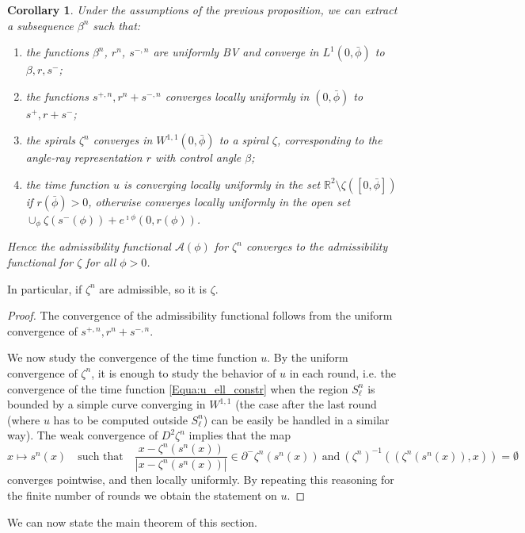 \documentclass[reqno]{amsart}
\newcounter{assu}
\theoremstyle{definition} \newtheorem{definition}{Definition}[section]
\theoremstyle{definition} \newtheorem{remark}[definition]{Remark}
\theoremstyle{plain} \newtheorem{lemma}[definition]{Lemma}
\theoremstyle{plain} \newtheorem{proposition}[definition]{Proposition}
\theoremstyle{plain} \newtheorem{theorem}[definition]{Theorem}
\theoremstyle{plain} \newtheorem{corollary}[definition]{Corollary}
\theoremstyle{definition} \newtheorem{example}[definition]{Example}
\theoremstyle{plain} \newtheorem{claim}[clai]{Claim}
\theoremstyle{definition} \newtheorem{assumption}[definition]{Assumption}
\theoremstyle{definition} \newtheorem{observation}[definition]{Observation}
\newcommand{\R}{\mathbb{R}}
\newcommand{\1}{\mathbbm 1}
\renewcommand{\i}{\imath}
\numberwithin{equation}{section} %
\theoremstyle{plain} \newtheorem*{theorem*}{Theorem}
\theoremstyle{plain} \newtheorem{mthm}[maintheorem]{Main Theorem}
\theoremstyle{plain} \newtheorem*{mthm*}{Main Theorem}
\theoremstyle{plain} \newtheorem*{conjecture*}{Conjecture}
\theoremstyle{plain} \newtheorem{conjecture}[definition]{Conjecture}
\theoremstyle{plain} \newtheorem*{problem*}{Problem}
\begin{document}
\begin{corollary}
\label{Cor:convergs}
Under the assumptions of the previous proposition, we can extract a subsequence $\beta^n$ such that:
\begin{enumerate}
\item the functions $\beta^n$, $r^n$, $s^{-,n}$ are uniformly BV and converge in $L^1(0,{\bar \phi})$ to $\beta,r,s^-$;
\item the functions $s^{+,n},r^n+s^{-,n}$ converges locally uniformly in $(0,{\bar \phi})$ to $s^+,r + s^-$;
\item the spirals $\zeta^n$ converges in $W^{1,1}(0,{\bar \phi})$ to a spiral $\zeta$, corresponding to the angle-ray representation $r$ with control angle $\beta$;
\item the time function $u$ is converging locally uniformly in the set $\R^2 \setminus \zeta([0,{\bar \phi}])$ if $r({\bar \phi}) > 0$, otherwise converges locally uniformly in the open set $\cup_\phi \zeta(s^-(\phi)) + e^{\i \phi} (0,r(\phi))$.
\end{enumerate}
Hence the admissibility functional $\mathcal A(\phi)$ for $\zeta^n$ converges to the admissibility functional for $\zeta$ for all $\phi > 0$.
\end{corollary}

In particular, if $\zeta^n$ are admissible, so it is $\zeta$.

\begin{proof}
The convergence of the admissibility functional follows from the uniform convergence of $s^{+,n},r^n + s^{-,n}$.

We now study the convergence of the time function $u$. By the uniform convergence of $\zeta^n$, it is enough to study the behavior of $u$ in each round, i.e. the convergence of the time function \eqref{Equa:u_ell_constr} when the region $S_\ell^n$ is bounded by a simple curve converging in $W^{1,1}$ (the case after the last round (where $u$ has to be computed outside $S_\ell^n$) can be easily be handled in a similar way). The weak convergence of $D^2 \zeta^{n}$ implies that the map
$$
x \mapsto s^n(x) \quad \text{such that} \quad \frac{x - \zeta^n(s^n(x))}{|x - \zeta^n(s^n(x))|} \in \partial^- \zeta^n(s^n(x)) \ \text{and} \ (\zeta^n)^{-1}((\zeta^n(s^n(x)),x)) = \emptyset
$$
converges pointwise, and then locally uniformly. By repeating this reasoning for the finite number of rounds we obtain the statement on $u$.
\end{proof}

We can now state the main theorem of this section.
\end{document}

